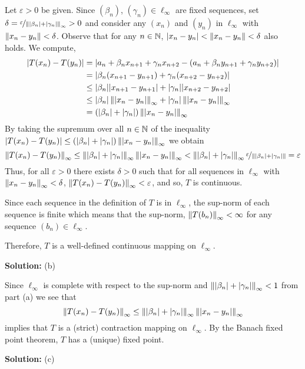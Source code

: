 \documentclass{article}
\begin{document}
Let $\varepsilon>0$ be given. Since $(\beta_n)$, $(\gamma_n)\in \ell_\infty$ are fixed sequences, set $\delta = \nicefrac{\varepsilon}{\left\lVert {|\beta_n| + |\gamma_n|} \right\rVert_\infty} > 0$ and consider any $(x_n)$ and $(y_n)$ in $\ell_\infty$ with $\left\lVert {x_n - y_n} \right\rVert < \delta$. Observe that for any $n\in \mathbb N$, $|x_n - y_n| < \left\lVert {x_n - y_n} \right\rVert <\delta$ also holds. We compute, 
	\begin{align*}
		|T(x_n) - T(y_n)| & = | a_n + \beta_n x_{n+1} + \gamma_n x_{n+2} - (a_n + \beta_n y_{n+1} + \gamma_n y_{n+2}) |\\
					 & = |\beta_n(x_{n+1} - y_{n+1}) + \gamma_n(x_{n+2} - y_{n+2})|\\
					 & \leq  |\beta_n||x_{n+1} - y_{n+1}| + |\gamma_n||x_{n+2} - y_{n+2}|\\
					 & \leq |\beta_n|\left\lVert {|x_n - y_{n}|} \right\rVert_\infty + |\gamma_n|\left\lVert {|x_{n} - y_{n}|} \right\rVert_\infty\\
					 & = (|\beta_n| + |\gamma_n|) \left\lVert {|x_{n} - y_{n}|} \right\rVert_\infty
		\end{align*}
By taking the supremum over all $n \in \mathbb N$ of the inequality $|T(x_n) - T(y_n)| \leq (|\beta_n| + |\gamma_n|) \left\lVert {|x_{n} - y_{n}|} \right\rVert_\infty$ we obtain
	\[\left\lVert {T(x_n) - T(y_n)} \right\rVert_\infty \leq \left\lVert {|\beta_n| + |\gamma_n|} \right\rVert_\infty \left\lVert {|x_{n} - y_{n}|} \right\rVert_\infty
		< \left\lVert {|\beta_n| + |\gamma_n|} \right\rVert_\infty  \nicefrac{\varepsilon}{\left\lVert {|\beta_n| + |\gamma_n|} \right\rVert} = \varepsilon \]
Thus, for all $\varepsilon > 0$ there exists $\delta > 0$ such that for all sequences in $\ell_\infty$ with $\left\lVert {x_n - y_n} \right\rVert_\infty < \delta$, $\left\lVert {T(x_n) - T(y_n)} \right\rVert_\infty<\varepsilon$, and so, $T$ is continuous. 

Since each sequence in the definition of $T$ is in $\ell_\infty$, the sup-norm of each sequence is finite which means that the sup-norm, $\left\lVert {T(b_n)} \right\rVert_\infty < \infty$ for any sequence $(b_n)\in \ell_\infty$.

Therefore, $T$ is a well-defined continuous mapping on $\ell_\infty$.

\textbf{Solution:} (b) 

Since $\ell_\infty$ is complete with respect to the sup-norm and $\left\lVert {|\beta_n| + |\gamma_n|} \right\rVert_\infty < 1$ from part (a) we see that 
	\[\left\lVert {T(x_n) - T(y_n)} \right\rVert_\infty \leq \left\lVert {|\beta_n| + |\gamma_n|} \right\rVert_\infty \left\lVert {|x_{n} - y_{n}|} \right\rVert_\infty\]
implies that $T$ is a (strict) contraction mapping on $\ell_\infty$. By the Banach fixed point theorem, $T$ has a (unique) fixed point.

\textbf{Solution:} (c)
\end{document}

